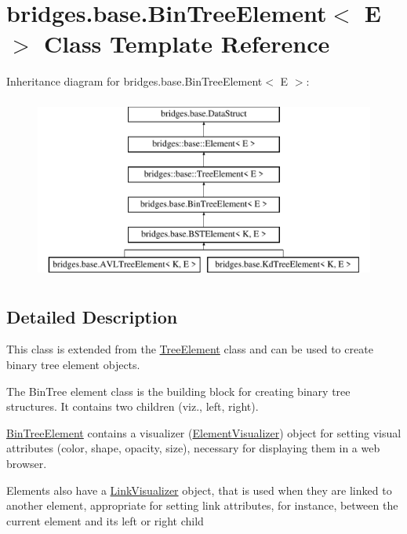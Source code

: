 \hypertarget{classbridges_1_1base_1_1_bin_tree_element}{}\section{bridges.\+base.\+Bin\+Tree\+Element$<$ E $>$ Class Template Reference}
\label{classbridges_1_1base_1_1_bin_tree_element}
Inheritance diagram for bridges.\+base.\+Bin\+Tree\+Element$<$ E $>$\+:\begin{figure}[H]
\begin{center}
\leavevmode
\includegraphics[height=6.000000cm]{classbridges_1_1base_1_1_bin_tree_element}
\end{center}
\end{figure}


\subsection{Detailed Description}
This class is extended from the \hyperlink{classbridges_1_1base_1_1_tree_element}{Tree\+Element} class and can be used to create binary tree element objects. 

The Bin\+Tree element class is the building block for creating binary tree structures. It contains two children (viz., left, right).

\hyperlink{classbridges_1_1base_1_1_bin_tree_element}{Bin\+Tree\+Element} contains a visualizer (\hyperlink{classbridges_1_1base_1_1_element_visualizer}{Element\+Visualizer}) object for setting visual attributes (color, shape, opacity, size), necessary for displaying them in a web browser.

Elements also have a \hyperlink{classbridges_1_1base_1_1_link_visualizer}{Link\+Visualizer} object, that is used when they are linked to another element, appropriate for setting link attributes, for instance, between the current element and its left or right child


